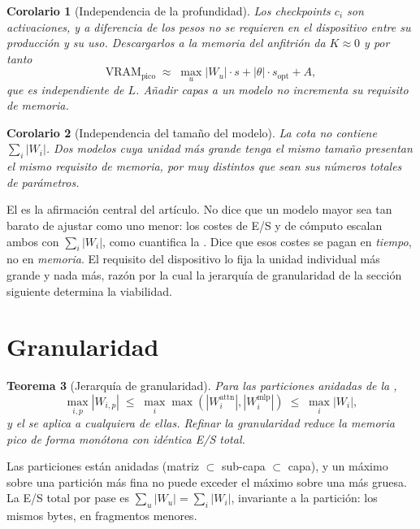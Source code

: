 \documentclass[journal]{IEEEtran}
\newtheorem{theorem}{Teorema}
\newtheorem{corollary}[theorem]{Corolario}
\newcommand{\Wu}{\lvert W_u \rvert}
\begin{document}
\begin{corollary}[Independencia de la profundidad]
\label{cor:depth}
Los checkpoints $c_i$ son activaciones, y a diferencia de los pesos no se requieren en el
dispositivo entre su producción y su uso. Descargarlos a la memoria del anfitrión da $K \approx 0$ y por tanto
\begin{equation}
\mathrm{VRAM}_{\text{pico}} \;\approx\; \max_u \Wu \cdot s + |\theta| \cdot s_{\text{opt}} + A ,
\end{equation}
que es independiente de $L$. Añadir capas a un modelo no incrementa su requisito de memoria.
\end{corollary}

\begin{corollary}[Independencia del tamaño del modelo]
\label{cor:size}
La cota no contiene $\sum_i |W_i|$. Dos modelos cuya unidad más grande tenga el mismo tamaño
presentan el mismo requisito de memoria, por muy distintos que sean sus números totales de
parámetros.
\end{corollary}

El  es la afirmación central del artículo. No dice que un modelo mayor sea tan
barato de ajustar como uno menor: los costes de E/S y de
cómputo escalan ambos con $\sum_i |W_i|$, como cuantifica la . Dice que esos costes
se pagan en \emph{tiempo}, no en \emph{memoria}. El requisito del dispositivo lo fija la unidad
individual más grande y nada más, razón por la cual la jerarquía de granularidad de la sección
siguiente determina la viabilidad.

\section{Granularidad}
\label{sec:gran}

\begin{theorem}[Jerarquía de granularidad]
\label{thm:gran}
Para las particiones anidadas de la ,
\begin{equation}
\max_{i,p} |W_{i,p}| \;\le\; \max_i \max\!\left(|W_i^{\text{attn}}|, |W_i^{\text{mlp}}|\right)
\;\le\; \max_i |W_i| ,
\end{equation}
y el  se aplica a cualquiera de ellas. Refinar la granularidad reduce la memoria
pico de forma monótona con idéntica E/S total.
\end{theorem}

\begin{IEEEproof}
Las particiones están anidadas (matriz $\subset$ sub-capa $\subset$ capa), y un máximo sobre una
partición más fina no puede exceder el máximo sobre una más gruesa. La E/S total por pase es
$\sum_u \Wu = \sum_i |W_i|$, invariante a la partición: los mismos bytes, en fragmentos menores.
\end{IEEEproof}
\end{document}
